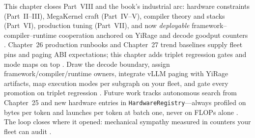 This chapter closes Part~VIII and the book's industrial arc: hardware constraints (Part~II--III), MegaKernel craft (Part~IV--V), compiler theory and stacks (Part~VI), production tuning (Part~VII), and now \emph{deployable} framework--compiler--runtime cooperation anchored on YiRage and decode goodput counters \citep{yirage2026,chen2020compilerbasedhardw,patel2025llminference,kwon2023vllm,taxbreak2026,memoryfloor2026,liu2024deepseekv3,nvidia2024cudagraphs,dao2022flashattention,semianalysis2024tma,amd2024xdna,amd2024aie,dao2023flashdecoding,nvidia2022hopper,dlbook}. Chapter~26 production runbooks and Chapter~27 trend baselines supply fleet pins and paging ABI expectations; this chapter adds triplet regression gates and mode maps on top \citep{patel2025llminference,yirage2026,chen2020compilerbasedhardw,kwon2023vllm,taxbreak2026,memoryfloor2026,dlbook}. Draw the decode boundary, assign framework/compiler/runtime owners, integrate vLLM paging with YiRage artifacts, map execution modes per subgraph on your fleet, and gate every promotion on triplet regression \citep{kwon2023vllm,yirage2026,chen2020compilerbasedhardw,patel2025llminference,taxbreak2026,memoryfloor2026,nvidia2024cudagraphs,dlbook}. Future work tracks autonomous search from Chapter~25 and new hardware entries in \texttt{HardwareRegistry}---always profiled on bytes per token and launches per token at batch one, never on FLOPs alone \citep{yirage2026,patel2025llminference,taxbreak2026,memoryfloor2026,chen2020compilerbasedhardw,dlbook}. The loop closes where it opened: mechanical sympathy measured in counters your fleet can audit \citep{patel2025llminference,yirage2026,chen2020compilerbasedhardw,kwon2023vllm,taxbreak2026,memoryfloor2026,dlbook}.

